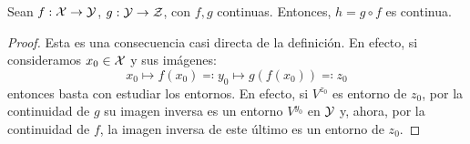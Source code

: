 \begin{prop}
	Sean $f:\mathcal{X}\to\mathcal{Y}$, $g:\mathcal{Y}\to\mathcal{Z}$, con $f,g$ continuas. Entonces, $h = g\circ f$ es continua.
	
	\begin{proof}
		Esta es una consecuencia casi directa de la definición. En efecto, si consideramos $x_0\in\mathcal{X}$ y sus imágenes:
		\[x_0\mapsto f(x_0)\eqqcolon y_0\mapsto g(f(x_0))\eqqcolon z_0\]
		entonces basta con estudiar los entornos. En efecto, si $V^{z_0}$ es entorno de $z_0$, por la continuidad de $g$ su imagen inversa es un entorno $V^{y_0}$ en $\mathcal{Y}$ y, ahora, por la continuidad de $f$, la imagen inversa de este último es un entorno de $z_0$.
	\end{proof}
\end{prop}
